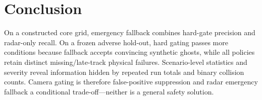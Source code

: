 \documentclass[conference]{IEEEtran}
\begin{document}
\section{Conclusion}
On a constructed core grid, emergency fallback combines hard-gate precision and
radar-only recall. On a frozen adverse hold-out, hard gating passes more
conditions because fallback accepts convincing synthetic ghosts, while all
policies retain distinct missing/late-track physical failures. Scenario-level
statistics and severity reveal information hidden by repeated run totals and
binary collision counts. Camera gating is therefore false-positive suppression
and radar emergency fallback a conditional trade-off---neither is a general
safety solution.

\balance


\end{document}

